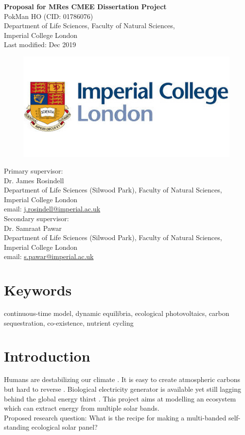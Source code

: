 \documentclass[a4paper, 11pt]{article}
\title{\ReportTitle}
\author{\ReportAuthor}
\date{}
\newcommand{\ReportTitle}{Proposal for MRes CMEE Dissertation Project}
\newcommand{\ReportAuthor}{PokMan HO (CID: 01786076)}
\newcommand{\ReportAffil}{Department of Life Sciences, Faculty of Natural Sciences,\\Imperial College London}
\begin{document}
	\begin{center}
		\Huge\textbf{\ReportTitle}\\
		\LARGE\ReportAuthor\\
		\Large\ReportAffil\\
		\Large{Last modified: Dec 2019}
	\end{center}
	\begin{figure}[h]
		\centering\includegraphics[width=\linewidth]{icl.jpg}
	\end{figure}
Primary supervisor:\\
\indent Dr. James Rosindell\\
\indent Department of Life Sciences (Silwood Park), Faculty of Natural Sciences, Imperial College London\\
\indent email: \href{mailto:j.rosindell@imperial.ac.uk}{j.rosindell@imperial.ac.uk}\\
Secondary supervisor:\\
\indent Dr. Samraat Pawar\\
\indent Department of Life Sciences (Silwood Park), Faculty of Natural Sciences, Imperial College London\\
\indent email: \href{mailto:s.pawar@imperial.ac.uk}{s.pawar@imperial.ac.uk}
\clearpage
\section{Keywords}
continuous-time model, dynamic equilibria, ecological photovoltaics, carbon sequestration, co-existence, nutrient cycling
\section{Introduction}
Humans are destabilizing our climate \autocite{schuur2015climate}.  It is easy to create atmospheric carbons but hard to reverse \autocite{yang2008progress}.  Biological electricity generator is available \autocite{mccormick2015biophotovoltaics} yet still lagging behind the global energy thirst \autocite{ferguson2000electricity}.  This project aims at modelling an ecosystem which can extract energy from multiple solar bands.\\
Proposed research question: What is the recipe for making a multi-banded self-standing ecological solar panel?
\end{document}
